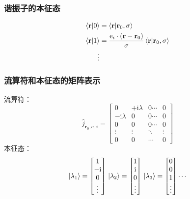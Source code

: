 \documentclass[UTF8]{beamer}
\begin{document}
\begin{frame}
	\frametitle{谐振子的本征态}
	\begin{align}
		\braket{\mathbf{r}|0} & =\braket{\mathbf{r}|\mathbf{r}_0,\sigma}\nonumber                                                 \\
		\braket{\mathbf{r}|1} & =\frac{\mathrm{e}_i\cdot(\mathbf{r}-\mathbf{r}_0)}{\sigma}\braket{\mathbf{r}|\mathbf{r}_0,\sigma} \\
		\vdots \nonumber
	\end{align}
\end{frame}
\begin{frame}
	\frametitle{流算符和本征态的矩阵表示}
	流算符：
	\begin{equation*}
		\hat{j}_{\mathbf{r}_0,\sigma,i}=
		\begin{bmatrix}
			0                  & +\mathrm{i}\lambda & 0\cdots & 0      \\
			-\mathrm{i}\lambda & 0                  & 0\cdots & 0      \\
			0                  & 0                  & 0\cdots & 0      \\
			\vdots             & \vdots             & \ddots  & \vdots \\
			0                  & 0                  & \cdots  & 0
		\end{bmatrix}
	\end{equation*}
	本征态：
	\begin{equation*}
		\,\ket{\lambda_{1}}=
		\begin{bmatrix}
			1           \\
			-\mathrm{i} \\
			0           \\
			\vdots
		\end{bmatrix}
		\,\ket{\lambda_{2}}=
		\begin{bmatrix}
			1          \\
			\mathrm{i} \\
			0          \\
			\vdots
		\end{bmatrix}
		\,\ket{\lambda_{3}}=
		\begin{bmatrix}
			0 \\
			0 \\
			1 \\
			\vdots
		\end{bmatrix}
		\cdots
	\end{equation*}
\end{frame}
\end{document}
